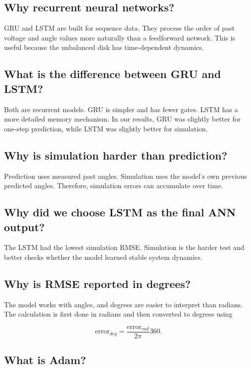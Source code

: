 \documentclass[11pt,a4paper]{article}
\begin{document}
\subsection*{Why recurrent neural networks?}

GRU and LSTM are built for sequence data.
They process the order of past voltage and angle values more naturally than a feedforward network.
This is useful because the unbalanced disk has time-dependent dynamics.

\subsection*{What is the difference between GRU and LSTM?}

Both are recurrent models.
GRU is simpler and has fewer gates.
LSTM has a more detailed memory mechanism.
In our results, GRU was slightly better for one-step prediction, while LSTM was slightly better for simulation.

\subsection*{Why is simulation harder than prediction?}

Prediction uses measured past angles.
Simulation uses the model's own previous predicted angles.
Therefore, simulation errors can accumulate over time.

\subsection*{Why did we choose LSTM as the final ANN output?}

The LSTM had the lowest simulation RMSE.
Simulation is the harder test and better checks whether the model learned stable system dynamics.

\subsection*{Why is RMSE reported in degrees?}

The model works with angles, and degrees are easier to interpret than radians.
The calculation is first done in radians and then converted to degrees using

\begin{equation}
\mathrm{error}_{deg} = \frac{\mathrm{error}_{rad}}{2\pi}360.
\end{equation}

\subsection*{What is Adam?}
\end{document}

